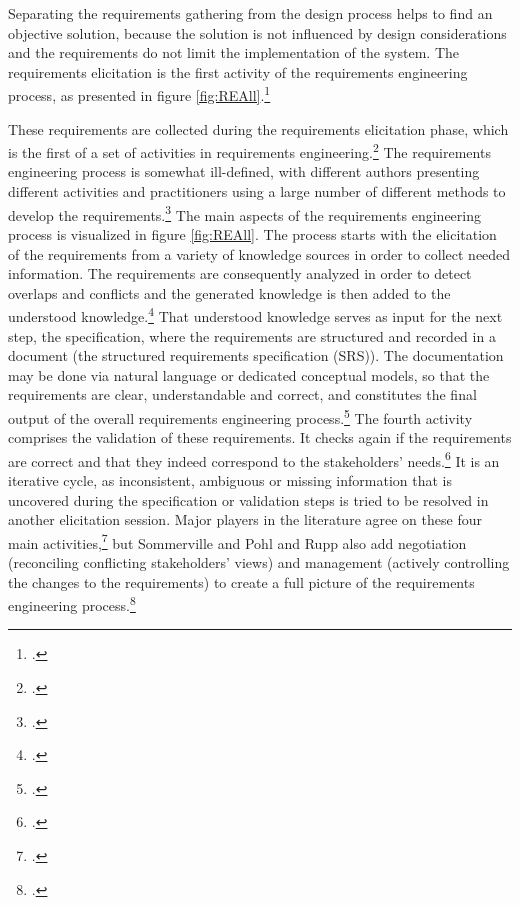 Separating the requirements gathering from the design process helps to find an objective solution, because the solution is not influenced by design considerations and the requirements do not limit the implementation of the system. The requirements elicitation is the first activity of the requirements engineering process, as presented in figure \ref{fig:REAll}.\footcites[Cf.][p.116]{SommervilleSoftwareengineering2011}[cf.][pp.17]{SommervilleIntegratedrequirementsengineering2005} 

These requirements are collected during the requirements elicitation phase, which is the first of a set of activities in requirements engineering.\footcites[Cf.][p.116]{SommervilleSoftwareengineering2011}[cf.][p.17]{SommervilleIntegratedrequirementsengineering2005} The requirements engineering process is somewhat ill-defined, with different authors presenting different activities and practitioners using a large number of different methods to develop the requirements.\footcite[Cf.][p.225]{ZhangEffectiverequirementsdevelopmentA2007} The main aspects of the requirements engineering process is visualized in figure \ref{fig:REAll}. The process starts with the elicitation of the requirements from a variety of knowledge sources in order to collect needed information. The requirements are consequently analyzed in order to detect overlaps and conflicts and the generated knowledge is then added to the understood knowledge.\footcite[Cf.][p.17]{SommervilleIntegratedrequirementsengineering2005} That understood knowledge serves as input for the next step, the specification, where the requirements are structured and recorded in a document (the structured requirements specification (SRS)). The documentation may be done via natural language or dedicated conceptual models, so that the requirements are clear, understandable and correct, and constitutes the final output of the overall requirements engineering process.\footcites[Cf.][p.17]{SommervilleIntegratedrequirementsengineering2005}[chapter 1]{PohlRequirementsengineeringfundamentals2011} The fourth activity comprises the validation of these requirements. It checks again if the requirements are correct and that they indeed correspond to the stakeholders' needs.\footcite[Cf.][p.17]{SommervilleIntegratedrequirementsengineering2005}
It is an iterative cycle, as inconsistent, ambiguous or missing information that is uncovered during the specification or validation steps is tried to be resolved in another elicitation session. 
Major players in the literature agree on these four main activities,\footcites[Cf.][p.225]{ZhangEffectiverequirementsdevelopmentA2007}[cf.][p.220]{DavisSoftwarerequirementsobjects1993}[cf.][chapter 1]{PohlRequirementsengineeringfundamentals2011}[cf.][p.116]{SommervilleSoftwareengineering2011} but Sommerville and Pohl and Rupp also add negotiation (reconciling conflicting stakeholders' views) and management (actively controlling the changes to the requirements) to create a full picture of the requirements engineering process.\footcites[Cf.][p.17]{SommervilleSoftwareengineering2011}[cf.][chapter 1]{PohlRequirementsengineeringfundamentals2011}


